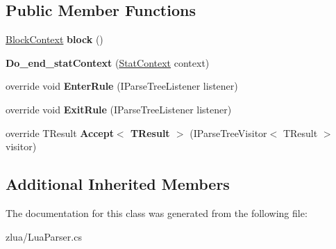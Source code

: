 \subsection*{Public Member Functions}
\begin{DoxyCompactItemize}
\item 
\mbox{\label{classzlua_1_1_lua_parser_1_1_do__end__stat_context_abeca51c056f8e55f868a08b66691c180}} 
\mbox{\hyperlink{classzlua_1_1_lua_parser_1_1_block_context}{Block\+Context}} {\bfseries block} ()
\item 
\mbox{\label{classzlua_1_1_lua_parser_1_1_do__end__stat_context_a64dd4479e4b3ac2e1034f3dbefc7e43b}} 
{\bfseries Do\+\_\+end\+\_\+stat\+Context} (\mbox{\hyperlink{classzlua_1_1_lua_parser_1_1_stat_context}{Stat\+Context}} context)
\item 
\mbox{\label{classzlua_1_1_lua_parser_1_1_do__end__stat_context_abc5aef5fc15aab73ddf0438368ba40bc}} 
override void {\bfseries Enter\+Rule} (I\+Parse\+Tree\+Listener listener)
\item 
\mbox{\label{classzlua_1_1_lua_parser_1_1_do__end__stat_context_a7d546013d51aa6e87e30f662765f5975}} 
override void {\bfseries Exit\+Rule} (I\+Parse\+Tree\+Listener listener)
\item 
\mbox{\label{classzlua_1_1_lua_parser_1_1_do__end__stat_context_aece568782ae1d598b98711df82b3117b}} 
override T\+Result {\bfseries Accept$<$ T\+Result $>$} (I\+Parse\+Tree\+Visitor$<$ T\+Result $>$ visitor)
\end{DoxyCompactItemize}
\subsection*{Additional Inherited Members}


The documentation for this class was generated from the following file\+:\begin{DoxyCompactItemize}
\item 
zlua/Lua\+Parser.\+cs\end{DoxyCompactItemize}
